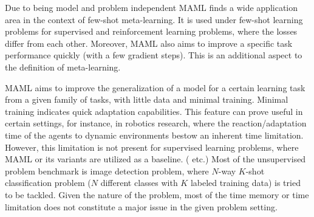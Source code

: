 
Due to being model and problem independent MAML finds a wide application area in the context of few-shot meta-learning. It is used under few-shot learning problems for supervised and reinforcement learning problems, where the losses differ from each other.  Moreover, MAML also aims to improve a specific task performance quickly (with a few gradient steps). This is an additional aspect to the definition of meta-learning. 


MAML aims to improve the generalization of a model for a certain learning task from a given family of tasks, with little data and minimal training. Minimal training indicates quick adaptation capabilities. This feature can prove useful in certain settings, for instance, in robotics research, where the reaction/adaptation time of the agents to dynamic environments bestow an inherent time limitation. However, this limitation is not present for supervised learning problems, where MAML or its variants are utilized as a baseline. (\eg \cite{flennerhag2019,nichol2018,rajasegaran2020,collins2020,guiroy2019} etc.) Most of the unsupervised problem benchmark is image detection problem, where $N$-way $K$-shot classification problem ($N$ different classes with $K$ labeled training data) is tried to be tackled. Given the nature of the problem, most of the time memory or time limitation does not constitute a major issue in the given problem setting.

